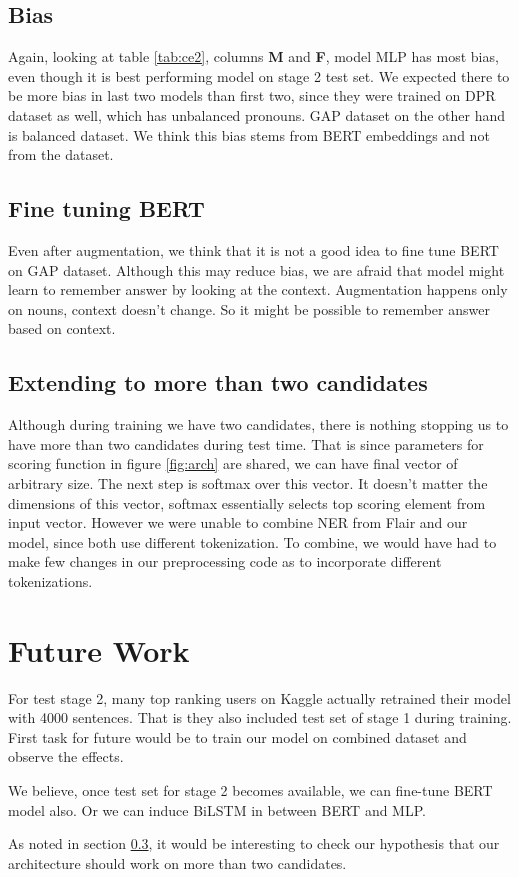 \documentclass[11pt,a4paper]{article}
\begin{document}
\subsection{Bias}
\label{sec:bias}
Again, looking at table \ref{tab:ce2}, columns \textbf{M} and \textbf{F}, model MLP has most bias, even though it is best performing model on stage 2 test set. We expected there to be more bias in last two models than first two, since they were trained on DPR dataset as well, which has unbalanced pronouns. GAP dataset on the other hand is balanced dataset. We think this bias stems from BERT embeddings and not from the dataset.

\subsection{Fine tuning BERT}
Even after augmentation, we think that it is not a good idea to fine tune BERT on GAP dataset. Although this may reduce bias, we are afraid that model might learn to remember answer by looking at the context. Augmentation happens only on nouns, context doesn't change. So it might be possible to remember answer based on context. %

\subsection{Extending to more than two candidates}
\label{subsec:morecandidates}
Although during training we have two candidates, there is nothing stopping us to have more than two candidates during test time. That is since parameters for scoring function in figure \ref{fig:arch} are shared, we can have final vector of arbitrary size. The next step is softmax over this vector. It doesn't matter the dimensions of this vector, softmax essentially selects top scoring element from input vector. However we were unable to combine NER from Flair and our model, since both use different tokenization. To combine, we would have had to make few changes in our preprocessing code as to incorporate different tokenizations.

\section{Future Work}
For test stage 2, many top ranking users on Kaggle actually retrained their model with 4000 sentences. That is they also included test set of stage 1 during training. First task for future would be to train our model on combined dataset and observe the effects.

We believe, once test set for stage 2 becomes available, we can fine-tune BERT model also. Or we can induce BiLSTM in between BERT and MLP.

As noted in section \ref{subsec:morecandidates}, it would be interesting to check our hypothesis that our architecture should work on more than two candidates.




\end{document}
